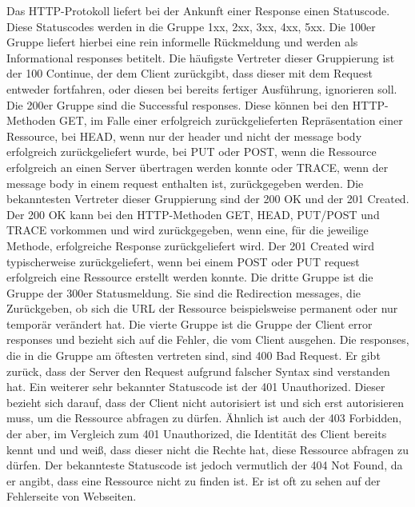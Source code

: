 Das HTTP-Protokoll liefert bei der Ankunft einer Response einen Statuscode. Diese Statuscodes werden in die Gruppe 1xx, 2xx, 3xx, 4xx, 5xx. Die 100er Gruppe liefert hierbei eine rein informelle Rückmeldung und werden als Informational responses betitelt. Die häufigste Vertreter dieser Gruppierung ist der 100 Continue, der dem Client zurückgibt, dass dieser mit dem Request entweder fortfahren, oder diesen bei bereits fertiger Ausführung, ignorieren soll.    \newline
Die 200er Gruppe sind die Successful responses. Diese können bei den HTTP-Methoden GET, im Falle einer erfolgreich zurückgelieferten Repräsentation einer Ressource, bei HEAD, wenn nur der header und nicht der message body erfolgreich zurückgeliefert wurde, bei PUT oder POST, wenn die Ressource erfolgreich an einen Server übertragen werden konnte oder TRACE, wenn der message body in einem request enthalten ist, zurückgegeben werden. Die bekanntesten Vertreter dieser Gruppierung sind der 200 OK und der 201 Created. Der 200 OK kann bei den HTTP-Methoden GET, HEAD, PUT/POST und TRACE vorkommen und wird zurückgegeben, wenn eine, für die jeweilige Methode, erfolgreiche Response zurückgeliefert wird. Der 201 Created wird typischerweise zurückgeliefert, wenn bei einem POST oder PUT request erfolgreich eine Ressource erstellt werden konnte.  \newline
Die dritte Gruppe ist die Gruppe der 300er Statusmeldung. Sie sind die Redirection messages, die Zurückgeben, ob sich die URL der Ressource beispielsweise permanent oder nur temporär verändert hat. \newline
Die vierte Gruppe ist die Gruppe der Client error responses und bezieht sich auf die Fehler, die vom Client ausgehen. Die responses, die in die Gruppe am öftesten vertreten sind, sind 400 Bad Request. Er gibt zurück, dass der Server den Request aufgrund falscher Syntax sind verstanden hat. Ein weiterer sehr bekannter Statuscode ist der 401 Unauthorized. Dieser bezieht sich darauf, dass der Client nicht autorisiert ist und sich erst autorisieren muss, um die Ressource abfragen zu dürfen. Ähnlich ist auch der 403 Forbidden, der aber, im Vergleich zum 401 Unauthorized, die Identität des Client bereits kennt und und weiß, dass dieser nicht die Rechte hat, diese Ressource abfragen zu dürfen. Der bekannteste Statuscode ist jedoch vermutlich der 404 Not Found, da er angibt, dass eine Ressource nicht zu finden ist. Er ist oft zu sehen auf der Fehlerseite von Webseiten. \newline
